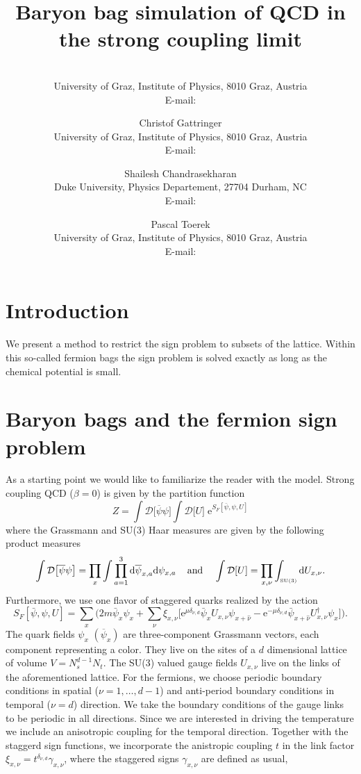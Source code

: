 \documentclass{PoS}
\title{Baryon bag simulation of QCD in the strong coupling limit}
\author{\speaker{Oliver Orasch}\\
        University of Graz, Institute of Physics, 8010 Graz, Austria\\
        E-mail: \email{oliver.orasch@uni-graz.at}}
\author{Christof Gattringer\\
        University of Graz, Institute of Physics, 8010 Graz, Austria\\
        E-mail: \email{christof.gattringer@uni-graz.at}}
\author{Shailesh Chandrasekharan\\
        Duke University, Physics Departement, 27704 Durham, NC\\
        E-mail: \email{sch@phy.duke.edu}}
\author{Pascal Toerek\\
        University of Graz, Institute of Physics, 8010 Graz, Austria\\
        E-mail: \email{pascal.toerek@uni-graz.at}}
\begin{document}
\section{Introduction}

We present a method to restrict the sign problem to subsets of the lattice. Within this so-called fermion bags the sign problem is solved exactly as long as the chemical potential is small.

\section{Baryon bags and the fermion sign problem}


As a starting point we would like to familiarize the reader with the model. Strong coupling QCD ($\beta = 0$) is given by the partition function
\begin{equation}
Z = \int \mathcal{D}\big[\overline{\psi}\psi\big] \int \mathcal{D}\big[U\big] \;\text{e}^{S_F\left[\bar{\psi},\psi,U\right]}
\label{eq:part_sum}
\end{equation} 
where the Grassmann and SU(3) Haar measures are given by the following product measures
\begin{equation*}
\int \mathcal{D}\big[\overline{\psi}\psi\big]  = \prod_{x} \int \prod_{a = 1}^{3}\text{d}\overline{\psi}_{x,a}\text{d}\psi_{x,a} \;\;\;\text{ and } \;\;\;\int \mathcal{D}[U] = \prod_{x,\nu} \int_{\text{\tiny SU(3)}} \text{d}U_{x,\nu}.
\end{equation*}
Furthermore, we use one flavor of staggered quarks realized by the action
\begin{equation}
S_F\left[\bar{\psi},\psi,U\right] = \sum_x\Big(2m\bar{\psi}_x \psi_x + \sum_{\nu} \xi_{x,\nu}\Big[ \text{e}^{\mu\delta_{\nu, d}}\bar{\psi}_{x} U_{x,\nu} \psi_{x+\hat{\nu}} - \text{e}^{-\mu\delta_{\nu, d}}\bar{\psi}_{x+\hat{\nu}}U^{\dagger}_{x, \nu} \psi_{x} \Big] \Big).
\label{eq:stag_act}
\end{equation}
The quark fields $\psi_x$ $(\overline{\psi}_x)$ are three-component Grassmann vectors, each component representing a color. They live on the sites of a $d$ dimensional lattice of volume $V = N_s^{d-1}N_t$. The SU(3) valued gauge fields $U_{x,\nu}$ live on the links of the aforementioned lattice. For the fermions, we choose periodic boundary conditions in spatial ($\nu = 1,\dots, d-1$) and anti-period boundary conditions in temporal ($\nu = d$) direction. We take the boundary conditions of the gauge links to be periodic in all directions. Since we are interested in driving the temperature we include an anisotropic coupling for the temporal direction. Together with the staggerd sign functions, we incorporate the anistropic coupling $t$ in the link factor $\xi_{x,\nu} = t^{\delta_{\nu,d}}\gamma_{x,\nu}$, where the staggered signs $\gamma_{x,\nu}$ are defined as usual,
\end{document}

